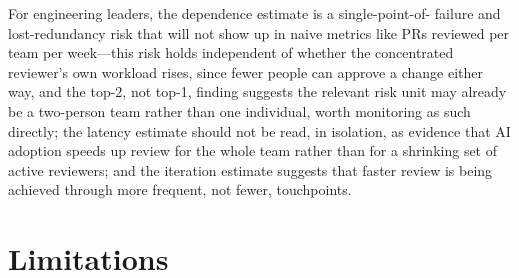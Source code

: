 \documentclass[12pt]{article}
\begin{document}
For engineering leaders, the dependence estimate is a single-point-of-
failure and lost-redundancy risk that will not show up in naive metrics
like PRs reviewed per team per week---this risk holds independent of
whether the concentrated reviewer's own workload rises, since fewer
people can approve a change either way, and the top-2, not top-1,
finding suggests the relevant risk unit may already be a two-person team
rather than one individual, worth monitoring as such directly; the
latency estimate should not be read, in isolation, as evidence that AI
adoption speeds up review for the whole team rather than for a shrinking
set of active reviewers; and the iteration estimate suggests that faster
review is being achieved through more frequent, not fewer, touchpoints.

\section{Limitations}
\end{document}
